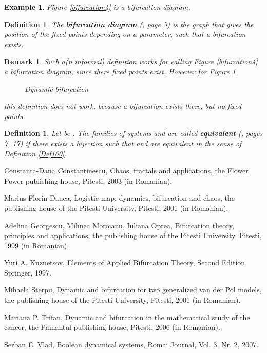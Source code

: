 \documentclass[12pt]{article}\usepackage{amsmath}
\newtheorem{definition}[theorem]{Definition}
\newtheorem{example}[theorem]{Example}
\newtheorem{remark}[theorem]{Remark}
\begin{document}
\begin{example}
Figure \ref{bifurcation4} is a bifurcation diagram.
\end{example}

\begin{definition}
The \textbf{bifurcation diagram} (\cite{bib3}, page 5) is the graph that gives
the position of the fixed points depending on a parameter, such that a
bifurcation exists.
\end{definition}

\begin{remark}
Such a(n informal) definition works for calling Figure \ref{bifurcation4} a
bifurcation diagram, since there fixed points exist. However for Figure
\ref{bifurcation5}
\begin{figure}
[ptb]
\begin{center}
\caption{Dynamic bifurcation}\label{bifurcation5}\end{center}
\end{figure}
this definition does not work, because a bifurcation exists there, but no
fixed points.
\end{remark}

\begin{definition}
Let be . The families of systems  and 
are called \textbf{equivalent} (\cite{bib5}, pages 7, 17) if there exists a
bijection  such that
 and  are equivalent in the sense of
Definition \ref{Def160}.
\end{definition}

\begin{thebibliography}{9}                                                                                                

Constanta-Dana Constantinescu, Chaos, fractals and
applications, the Flower Power publishing house, Pitesti, 2003 (in Romanian).

Marius-Florin Danca, Logistic map: dynamics, bifurcation and
chaos, the publishing house of the Pitesti University, Pitesti, 2001 (in Romanian).

Adelina Georgescu, Mihnea Moroianu, Iuliana Oprea, Bifurcation
theory, principles and applications, the publishing house of the Pitesti
University, Pitesti, 1999 (in Romanian).

Yuri A. Kuznetsov, Elements of Applied Bifurcation Theory,
Second Edition, Springer, 1997.

Mihaela Sterpu, Dynamic and bifurcation for two generalized van
der Pol models, the publishing house of the Pitesti University, Pitesti, 2001
(in Romanian).

Mariana P. Trifan, Dynamic and bifurcation in the mathematical
study of the cancer, the Pamantul publishing house, Pitesti, 2006 (in Romanian).

Serban E. Vlad, Boolean dynamical systems, Romai Journal, Vol.
3, Nr. 2, 2007.
\end{thebibliography}
\end{document}
